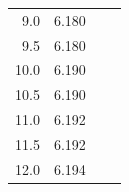 \documentclass[a4paper,12pt]{article}
\begin{document}
\begin{table}[h]
{\begin{tabular}{|r|r|rcrrrr}
9.0                    & 6.180                  & \multicolumn{1}{r}{}                   & \multicolumn{5}{c}{}                                                                                                                                                                                                               \\ \cline{1-2}
9.5                    & 6.180                  & \multicolumn{1}{r}{}                   & \multicolumn{5}{c}{}                                                                                                                                                                                                               \\ \cline{1-2}
10.0                   & 6.190                  & \multicolumn{1}{r}{}                   & \multicolumn{5}{c}{}                                                                                                                                                                                                               \\ \cline{1-2}
10.5                   & 6.190                  & \multicolumn{1}{r}{}                   & \multicolumn{5}{c}{}                                                                                                                                                                                                               \\ \cline{1-2}
11.0                   & 6.192                  & \multicolumn{1}{r}{}                   & \multicolumn{5}{c}{}                                                                                                                                                                                                               \\ \cline{1-2}
11.5                   & 6.192                  & \multicolumn{1}{r}{}                   & \multicolumn{5}{c}{}                                                                                                                                                                                                               \\ \cline{1-2}
12.0                   & 6.194                  & \multicolumn{1}{r}{}                   & \multicolumn{5}{c}{}                                                                                                                                                                                                               \\ \cline{1-2}

\end{tabular}}
\end{table}
\end{document}
